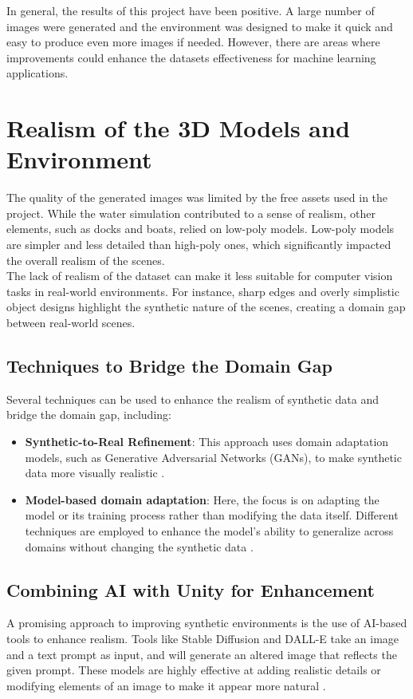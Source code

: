 
In general, the results of this project have been positive. A large number of images were generated and the environment was designed to make it quick and easy to produce even more images if needed. However, there are areas where improvements could enhance the datasets effectiveness for machine learning applications.

\section{Realism of the 3D Models and Environment}
The quality of the generated images was limited by the free assets used in the project. While the water simulation contributed to a sense of realism, other elements, such as docks and boats, relied on low-poly models. Low-poly models are simpler and less detailed than high-poly ones, which significantly impacted the overall realism of the scenes. \\

\noindent The lack of realism of the dataset can make it less suitable for computer vision tasks in real-world environments. For instance, sharp edges and overly simplistic object designs highlight the synthetic nature of the scenes, creating a domain gap between real-world scenes.

\subsection{Techniques to Bridge the Domain Gap}
Several techniques can be used to enhance the realism of synthetic data and bridge the domain gap, including:

\begin{itemize}
    \item \textbf{Synthetic-to-Real Refinement}: This approach uses domain adaptation models, such as Generative Adversarial Networks (GANs), to make synthetic data more visually realistic \cite{nikolenko2021synthetic}.

    \item \textbf{Model-based domain adaptation}: Here, the focus is on adapting the model or its training process rather than modifying the data itself. Different techniques are employed to enhance the model's ability to generalize across domains without changing the synthetic data \cite{nikolenko2021synthetic}.
\end{itemize}


\subsection{Combining AI with Unity for Enhancement}
A promising approach to improving synthetic environments is the use of AI-based tools to enhance realism. Tools like Stable Diffusion and DALL-E take an image and a text prompt as input, and will generate an altered image that reflects the given prompt. These models are highly effective at adding realistic details or modifying elements of an image to make it appear more natural \cite{aiToExoand}. \\

